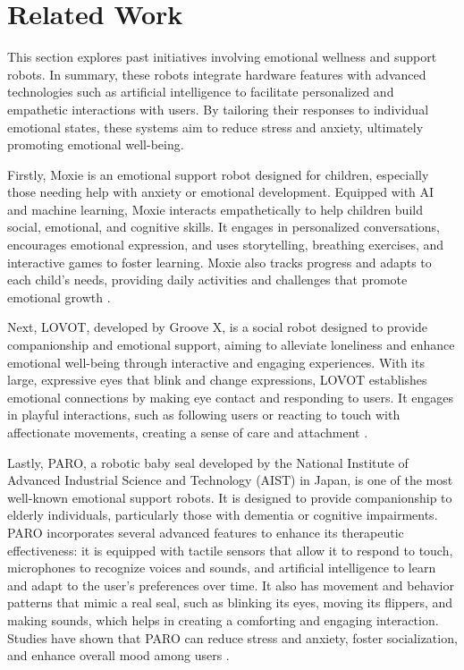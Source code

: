 \section{Related Work}
This section explores past initiatives involving emotional wellness and support robots. In summary, these robots integrate hardware features with advanced technologies such as artificial intelligence to facilitate personalized and empathetic interactions with users. By tailoring their responses to individual emotional states, these systems aim to reduce stress and anxiety, ultimately promoting emotional well-being.

Firstly, Moxie is an emotional support robot designed for children, especially those needing help with anxiety or emotional development. Equipped with AI and machine learning, Moxie interacts empathetically to help children build social, emotional, and cognitive skills. It engages in personalized conversations, encourages emotional expression, and uses storytelling, breathing exercises, and interactive games to foster learning. Moxie also tracks progress and adapts to each child’s needs, providing daily activities and challenges that promote emotional growth \cite{hurst2020socialemotionalskillstraining}.

Next, LOVOT, developed by Groove X, is a social robot designed to provide companionship and emotional support, aiming to alleviate loneliness and enhance emotional well-being through interactive and engaging experiences. With its large, expressive eyes that blink and change expressions, LOVOT establishes emotional connections by making eye contact and responding to users. It engages in playful interactions, such as following users or reacting to touch with affectionate movements, creating a sense of care and attachment \cite{lovot}. 

Lastly, PARO, a robotic baby seal developed by the National Institute of Advanced Industrial Science and Technology (AIST) in Japan, is one of the most well-known emotional support robots. It is designed to provide companionship to elderly individuals, particularly those with dementia or cognitive impairments. PARO incorporates several advanced features to enhance its therapeutic effectiveness: it is equipped with tactile sensors that allow it to respond to touch, microphones to recognize voices and sounds, and artificial intelligence to learn and adapt to the user’s preferences over time. It also has movement and behavior patterns that mimic a real seal, such as blinking its eyes, moving its flippers, and making sounds, which helps in creating a comforting and engaging interaction. Studies have shown that PARO can reduce stress and anxiety, foster socialization, and enhance overall mood among users \cite{wada2006}.
